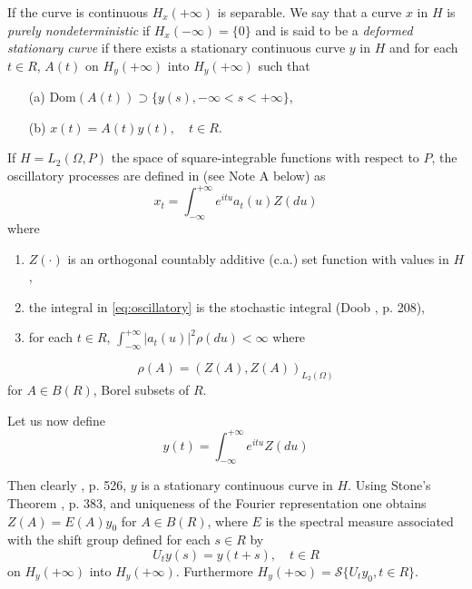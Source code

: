\documentclass{article}
\begin{document}
If the curve is continuous $H_{x}(+\infty)$ is separable. We say that a curve $x$ in $H$ is \emph{purely nondeterministic} if $H_{x}(-\infty)=\{0\}$ and is said to be a \emph{deformed stationary curve} if there exists a stationary continuous curve $y$ in $H$ and for each $t \in R$, $A(t)$ on $H_{y}(+\infty)$ into $H_{y}(+\infty)$ such that
\begin{itemize}
    \item[(a)] $\mathrm{Dom}(A(t)) \supset \{y(s), -\infty < s < +\infty\}$,
    \item[(b)] $x(t) = A(t) y(t), \quad t \in R$.
\end{itemize}

If $H=L_{2}(\Omega, P)$ the space of square-integrable functions with respect to $P$, the oscillatory processes are defined in \cite{Priestley} (see Note A below) as
\begin{equation}
x_{t}=\int_{-\infty}^{+\infty} e^{i t u} a_{t}(u) Z(du) \label{eq:oscillatory}
\end{equation}
where 
\begin{enumerate}[label=(\roman*)]
    \item $Z(\cdot)$ is an orthogonal countably additive (c.a.) set function with values in $H$,
    \item the integral in \eqref{eq:oscillatory} is the stochastic integral (Doob \cite{Doob}, p. 208),
    \item for each $t \in R$, $\int_{-\infty}^{+\infty}|a_{t}(u)|^{2} \rho(du)<\infty$ where
\end{enumerate}
\begin{equation}
\rho(A)=(Z(A), Z(A))_{L_{2}(\Omega)} \label{eq:rho}
\end{equation}
for $A \in B(R)$, Borel subsets of $R$.

Let us now define
\begin{equation}
y(t)=\int_{-\infty}^{+\infty} e^{i t u} Z(du) \label{eq:y_def}
\end{equation}

Then clearly \cite{Doob}, p. 526, $y$ is a stationary continuous curve in $H$. Using Stone's Theorem \cite{Riesz}, p. 383, and uniqueness of the Fourier representation one obtains $Z(A)=E(A) y_{0}$ for $A \in B(R)$, where $E$ is the spectral measure associated with the shift group defined for each $s \in R$ by
\begin{equation}
U_{t} y(s)=y(t+s), \quad t \in R \label{eq:shift_group}
\end{equation}
on $H_{y}(+\infty)$ into $H_{y}(+\infty)$. Furthermore $H_{y}(+\infty)=\mathcal{S}\{U_{t} y_{0}, t \in R\}$.
\end{document}

